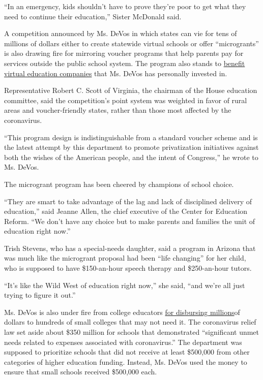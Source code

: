 ``In an emergency, kids shouldn't have to prove they're poor to get what
they need to continue their education,'' Sister McDonald said.

A competition announced by Ms. DeVos in which states can vie for tens of
millions of dollars either to create statewide virtual schools or offer
``microgrants'' is also drawing fire for mirroring voucher programs that
help parents pay for services outside the public school system. The
program also stands to
\href{https://www.the74million.org/article/betsy-devos-trumps-edsec-pick-promoted-virtual-schools-despite-dismal-results/}{benefit
virtual education companies} that Ms. DeVos has personally invested in.

Representative Robert C. Scott of Virginia, the chairman of the House
education committee, said the competition's point system was weighted in
favor of rural areas and voucher-friendly states, rather than those most
affected by the coronavirus.

``This program design is indistinguishable from a standard voucher
scheme and is the latest attempt by this department to promote
privatization initiatives against both the wishes of the American
people, and the intent of Congress,'' he wrote to Ms. DeVos.

The microgrant program has been cheered by champions of school choice.

``They are smart to take advantage of the lag and lack of disciplined
delivery of education,'' said Jeanne Allen, the chief executive of the
Center for Education Reform. ``We don't have any choice but to make
parents and families the unit of education right now.''

Trish Stevens, who has a special-needs daughter, said a program in
Arizona that was much like the microgrant proposal had been ``life
changing'' for her child, who is supposed to have \$150-an-hour speech
therapy and \$250-an-hour tutors.

``It's like the Wild West of education right now,'' she said, ``and
we're all just trying to figure it out.''

Ms. DeVos is also under fire from college educators
\href{https://www.insidehighered.com/news/2020/05/07/small-colleges-get-millions-while-other-colleges-struggle\#.XrQZ_cKvTlA.twitter}{for
disbursing millions}of dollars to hundreds of small colleges that may
not need it. The coronavirus relief law set aside about \$350 million
for schools that demonstrated ``significant unmet needs related to
expenses associated with coronavirus.'' The department was supposed to
prioritize schools that did not receive at least \$500,000 from other
categories of higher education funding. Instead, Ms. DeVos used the
money to ensure that small schools received \$500,000 each.

